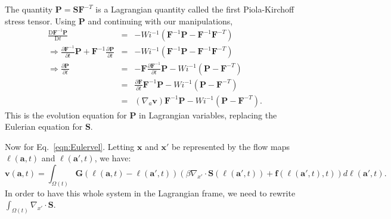 \documentclass[12pt]{article}
\newcommand{\bees}[1]{\begin{equation*} #1 \end{equation*}}
\newcommand{\baas}[1]{\begin{eqnarray*} #1 \end{eqnarray*}}
\newcommand{\pd}[2]{\ensuremath{\frac{\partial #1}{\partial #2}}}
\newcommand{\bx}{{\mathbf x}}
\newcommand{\ba}{{\mathbf a}}
\newcommand{\bl}{{\pmb \ell}}
\newcommand{\bv}{{\mathbf v}}
\newcommand{\ff}{{\mathbf f}}
\newcommand{\bS}{{\mathbf S}}
\newcommand{\bG}{{\mathbf G}}
\newcommand{\bF}{{\mathbf F}}
\newcommand{\bP}{{\mathbf P}}
\begin{document}
	The quantity $\bP = \bS\bF^{-T}$ is a Lagrangian quantity called the first Piola-Kirchoff stress tensor. Using $\bP$ and continuing with our manipulations,
	\baas{
	\frac{\text{D}\bF^{-1}\bP}{\text{D} t} &=& -Wi^{-1}\left( \bF^{-1}\bP - \bF^{-1}\bF^{-T} \right) \\
	\Rightarrow \pd{\bF^{-1}}{t}\bP + \bF^{-1}\pd{\bP}{t} &=& -Wi^{-1}\left( \bF^{-1}\bP - \bF^{-1}\bF^{-T} \right) \\
	\Rightarrow  \pd{\bP}{t} &=& -\bF\pd{\bF^{-1}}{t}\bP-Wi^{-1}\left( \bP - \bF^{-T} \right) \\
	& =& \pd{\bF}{t}\bF^{-1}\bP - Wi^{-1}\left( \bP - \bF^{-T} \right) \\
	& =& \left(\nabla_a \bv\right)\bF^{-1}\bP - Wi^{-1}\left( \bP - \bF^{-T} \right).
	}
	This is the evolution equation for $\bP$ in Lagrangian variables, replacing the Eulerian equation for $\bS$. 
	
	Now for Eq.~\eqref{eqn:Eulervel}. Letting $\bx$ and $\bx'$ be represented by the flow maps $\bl(\ba,t)$ and $\bl(\ba',t)$, we have:
	\bees{
	 \bv(\ba,t) = \int_{\Omega(t)} \bG(\bl(\ba,t) - \bl(\ba',t)) \left( \beta \nabla_{x'} \cdot \bS(\bl(\ba',t)) + \ff(\bl(\ba',t),t) \right) d\bl(\ba',t) .
	} 
	In order to have this whole system in the Lagrangian frame, we need to rewrite $\int_{\Omega(t)} \nabla_{x'} \cdot \bS$. 
	
\end{document}
